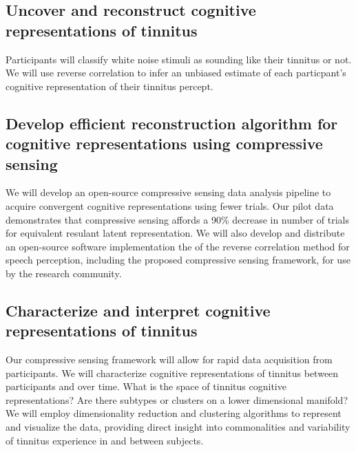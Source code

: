 \documentclass[11pt]{nih}
\begin{document}
\subsection{Uncover and reconstruct cognitive representations of tinnitus}
Participants will classify white noise stimuli as sounding like their tinnitus or not.
We will use reverse correlation to infer an unbiased estimate of each particpant's cognitive representation of their tinnitus percept.

\subsection{Develop efficient reconstruction algorithm for cognitive representations using compressive sensing}
We will develop an open-source compressive sensing data analysis pipeline to acquire convergent cognitive representations using fewer trials.
Our pilot data demonstrates that compressive sensing affords a 90\% decrease in number of trials for equivalent resulant latent representation.
We will also develop and distribute an open-source software
implementation the of the reverse correlation method for speech perception, including the proposed
compressive sensing framework, for use by the research community.

\subsection{Characterize and interpret cognitive representations of tinnitus}
Our compressive sensing framework will allow for rapid data acquisition from participants.
We will characterize cognitive representations of tinnitus between participants and over time.
What is the space of tinnitus cognitive representations? Are there subtypes or clusters on a lower dimensional manifold?
We will employ dimensionality reduction and clustering algorithms to represent and visualize the data,
providing direct insight into commonalities and variability of tinnitus experience in and between subjects.
\end{document}
